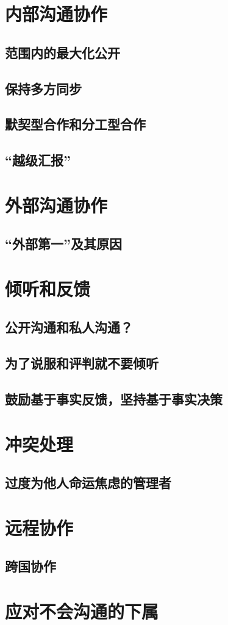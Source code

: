 
\section{内部沟通协作}
\subsection{范围内的最大化公开}
\subsection{保持多方同步}
\subsection{默契型合作和分工型合作}
\subsection{“越级汇报”}

\section{外部沟通协作}
\subsection{“外部第一”及其原因}

\section{倾听和反馈}
\subsection{公开沟通和私人沟通？}
\subsection{为了说服和评判就不要倾听}
\subsection{鼓励基于事实反馈，坚持基于事实决策}

\section{冲突处理}
\subsection{过度为他人命运焦虑的管理者}

\section{远程协作}
\subsection{跨国协作}

\section{应对不会沟通的下属}
